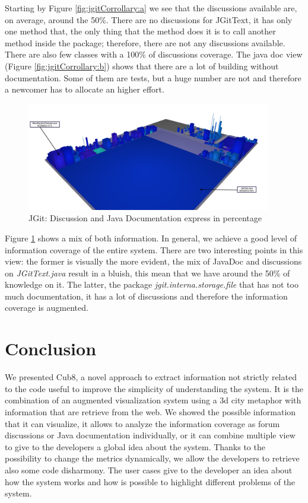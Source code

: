\documentclass[]{usiinfbachelorproject}
\begin{document}
Starting by Figure \ref{fig:jgitCorrollary:a} we see that the discussions available are, on average, around the 50\%. There are no discussions for JGitText, it has only one method that, the only thing that the method does it is to call another method inside the package; therefore, there are not any discussions available. There are also few classes with a 100\% of discussions coverage.
The java doc view (Figure  \ref{fig:jgitCorrollary:b}) shows that there are a lot of building without documentation. Some of them are tests, but a huge number are not and therefore a newcomer has to allocate an higher effort.  
\begin{figure}[H]
	\centering
	\includegraphics[width=0.95\textwidth]{images/jgitDocDisc}
	\caption[JGit: Discussion and Java Doc]{JGit: Discussion and Java Documentation express in percentage  \label{fig:jgitCorrollary:c}}
\end{figure}
Figure  \ref{fig:jgitCorrollary:c} shows a mix of both information. In general, we achieve a good level of information coverage of the entire system. There are two interesting points in this view: the former is  visually the more evident, the mix of JavaDoc and discussions on  \textit{JGitText.java} result in a bluish, this mean that we have around the 50\% of knowledge on it. The latter, the package \textit{jgit.interna.storage.file} that has not too much documentation, it has a lot  of discussions and therefore the information coverage is augmented. 














\newpage
\section{Conclusion} \label{conclusion}
We presented Cub8, a novel approach to extract information not strictly related to the code useful to improve the simplicity of understanding the system. It is the combination of an augmented visualization system using a 3d city metaphor with information that are retrieve from the web. We showed the possible information that it can visualize, it allows to analyze the information coverage as forum discussions or Java documentation individually, or it can combine multiple view to give to the developers a global idea about the system. Thanks to the possibility to change the metrics dynamically, we allow the developers to retrieve also some code disharmony. The user cases give to the developer an idea about how the system works and how is possible to highlight different problems of the system.
  
  

\newpage



\end{document}

